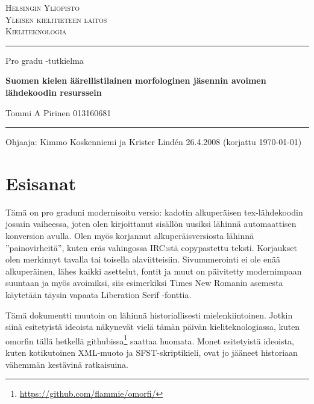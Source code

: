 \documentclass[free]{flammie}
\begin{document}
\parskip 2mm
\parindent 0mm

\begin{titlepage}
  \setlength{\parindent}{0mm}
  \sloppy
  \large \textsc{Helsingin Yliopisto \\
                 Yleisen kielitieteen laitos \\
                 Kieliteknologia}
  \vspace{5mm}

  \hrule height3pt
  \vspace{20mm}

  \begin{center}
    \large Pro gradu -tutkielma
    \linebreak \vfill

    \huge \textbf{Suomen kielen äärellistilainen morfologinen jäsennin avoimen
lähdekoodin resurssein}
    \vspace{20mm}

    \Large Tommi A Pirinen \linebreak
    \normalsize 013160681  %
    \vfill

  \end{center}
  \hrule height2pt
  \vspace{15mm}

  Ohjaaja: Kimmo Koskenniemi ja Krister Lindén
  \hfill
  26.4.2008 (korjattu \today)    %
\end{titlepage}

\tableofcontents

\pagebreak

\section*{Esisanat}

Tämä on pro graduni modernisoitu versio: kadotin alkuperäisen tex-lähdekoodin
jossain vaiheessa, joten olen kirjoittanut sisällön uusiksi lähinnä
automaattisen konversion avulla. Olen myös korjannut alkuperäisversiosta
lähinnä ''painovirheitä'', kuten eräs vahingossa IRC:stä copypastettu teksti.
Korjaukset olen merkinnyt tavalla tai toisella alaviitteisiin. Sivunumerointi
ei ole enää alkuperäinen, lähes kaikki asettelut, fontit ja muut on päivitetty
modernimpaan suuntaan ja myös avoimiksi, siis esimerkiksi Times New Romanin
asemesta käytetään täysin vapaata Liberation Serif -fonttia.

Tämä dokumentti muutoin on lähinnä historiallisesti mielenkiintoinen. Jotkin
siinä esitetyistä ideoista näkynevät vielä tämän päivän kieliteknologiassa,
kuten omorfin tällä hetkellä
githubissa\footnote{\url{https://github.com/flammie/omorfi/}} saattaa huomata.
Monet esitetyistä ideoista, kuten kotikutoinen XML-muoto ja SFST-skriptikieli,
ovat jo jääneet historiaan vähemmän kestävinä ratkaisuina.
\end{document}
